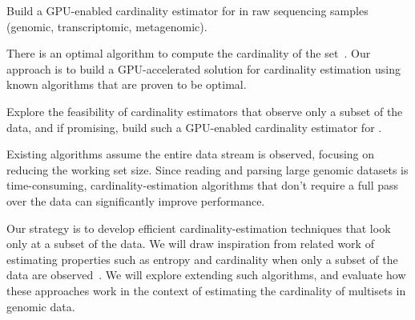 \begin{rproblem}
Build a GPU-enabled cardinality estimator for \kmers in raw sequencing samples (genomic, transcriptomic, metagenomic).
\end{rproblem}

There is an optimal algorithm to compute the cardinality of the set~\cite{Kane2010}.
Our approach is to build a GPU-accelerated solution for cardinality estimation using known algorithms that are proven to be optimal.

\begin{rproblem}
Explore the feasibility of cardinality estimators that observe only a  subset of the data, and if promising, build such a GPU-enabled cardinality estimator for \kmers.
\end{rproblem}

Existing algorithms assume the entire data stream is observed, focusing on reducing the working set size. Since reading and parsing large genomic datasets is time-consuming, cardinality-estimation algorithms that don't require a full pass over the data can significantly improve performance.



Our strategy is to develop efficient cardinality-estimation techniques that look only at a subset of the data. 
We will draw inspiration from related work of estimating properties such as entropy and cardinality when only a subset of the data are observed~\cite{valiant2017estimating}.  We will explore extending such algorithms, and evaluate how these approaches work in the context of estimating the cardinality of \kmer multisets in genomic data.  
